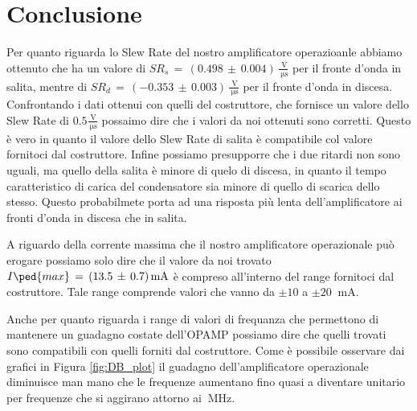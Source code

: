 \section*{Conclusione}

Per quanto riguarda lo Slew Rate del nostro amplificatore operazioanle abbiamo ottenuto che ha un valore di $SR_s\,=\,(0.498\,\pm\,0.004)\,\frac{\SI{}{\volt}}{\SI{}{\micro\second}}$ per il fronte d'onda in salita, mentre di $SR_d\,=\,(-0.353\,\pm\,0.003)\,\frac{\SI{}{\volt}}{\SI{}{\micro\second}}$ per il fronte d'onda in discesa. Confrontando i dati ottenui con quelli del costruttore, che fornisce un valore dello Slew Rate di $0.5 \frac{\SI{}{\volt}}{\SI{}{\micro\second}}$ possaimo dire che i valori da noi ottenuti sono corretti. Questo è vero in quanto il valore dello Slew Rate di salita è compatibile col valore fornitoci dal costruttore. Infine possiamo presupporre che i due ritardi non sono uguali, ma quello della salita è minore di quelo di discesa, in quanto il tempo caratteristico di carica del condensatore sia minore di quello di scarica dello stesso. Questo probabilmete porta ad una risposta più lenta dell'amplificatore ai fronti d'onda in discesa che in salita.

A riguardo della corrente massima che il nostro amplificatore operazionale può erogare possiamo solo dire che il valore da noi trovato $I\ped{max}\,=\,(13.5\,\pm\,0.7)\,\SI{}{\milli\ampere}$ è compreso all'interno del range fornitoci dal costruttore. Tale range comprende valori che vanno da $\pm10$ a $\pm20$ $\SI{}{\milli\ampere}$.

Anche per quanto riguarda i range di valori di frequanza che permettono di mantenere un guadagno costate dell'OPAMP possiamo dire che quelli trovati sono compatibili con quelli forniti dal costruttore. Come è possibile osservare dai grafici in Figura \ref{fig:DB_plot} il guadagno dell'amplificatore operazionale diminuisce man mano che le frequenze aumentano fino quasi a diventare unitario per frequenze che si aggirano attorno ai $\SI{}{\mega\hertz}$.
